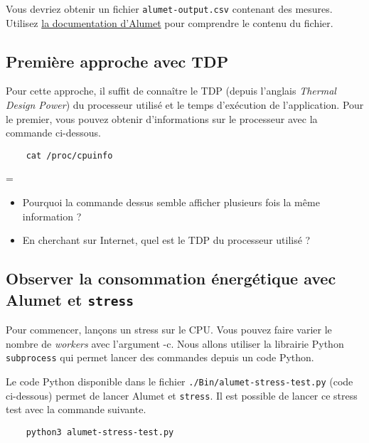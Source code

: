 \documentclass[a4paper,10pt]{article}
\newenvironment{question}
  {\par\begin{mdframed}[linewidth=2pt,linecolor=red]%
    \begin{list}{}{\leftmargin=1cm
                   \labelwidth=\leftmargin}\item[\emoji{red-question-mark}]}
  {\end{list}\end{mdframed}\par}
\newtheorem{question}{Question}
\begin{document}
Vous devriez obtenir un fichier \texttt{alumet-output.csv} contenant des mesures.
Utilisez
\href{https://alumet-dev.github.io/user-book/installation/exec.html}{la
documentation d'Alumet} pour comprendre le contenu du fichier.

\subsection{Première approche avec TDP}

Pour cette approche, il suffit de connaître le TDP (depuis l'anglais
\textit{Thermal Design Power}) du processeur utilisé et le temps d'exécution de
l'application. Pour le premier, vous pouvez obtenir d'informations sur le
processeur avec la commande ci-dessous.

\begin{jupytercode}
    \begin{lstlisting}
    cat /proc/cpuinfo
    \end{lstlisting}    
\end{jupytercode}

\begin{question}
\begin{itemize}
    \item Pourquoi la commande dessus semble afficher
    plusieurs fois la même information ?
    \item En cherchant sur Internet, quel est le TDP du
    processeur utilisé ? 
\end{itemize}
\end{question}


\subsection{Observer la consommation énergétique avec Alumet et \texttt{stress}}

Pour commencer, lançons un stress sur le CPU. Vous pouvez faire varier le nombre
de \textit{workers} avec l'argument -c. Nous allons utiliser la librairie Python
\texttt{subprocess} qui permet lancer des commandes depuis un code Python.

Le code Python disponible dans le fichier \texttt{./Bin/alumet-stress-test.py}
(code ci-dessous) permet de lancer Alumet et \texttt{stress}. Il est possible de
lancer ce stress test avec la commande suivante.

\begin{jupytercode}
    \begin{lstlisting}
    python3 alumet-stress-test.py
    \end{lstlisting}    
\end{jupytercode}
\end{document}
